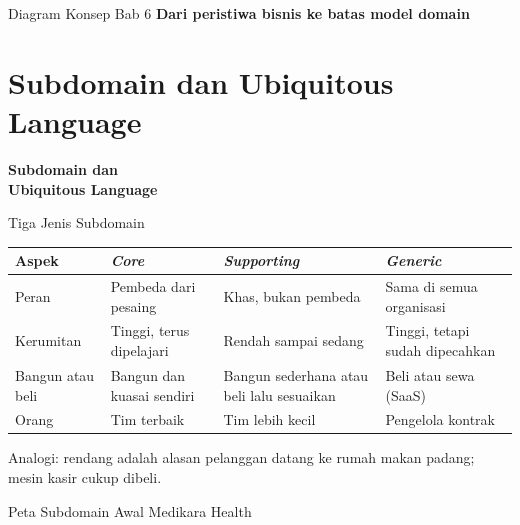 \documentclass[aspectratio=169, table, 12pt]{beamer}
\begin{document}
\begin{frame}{{\Large Diagram Konsep Bab 6}}
  \centering
  {\small\bfseries Dari peristiwa bisnis ke batas model domain}\par\medskip
\end{frame}

\section{Subdomain dan Ubiquitous Language}

\begin{frame}{\hfill}
  \centering
  \Huge{\textbf{Subdomain dan\\Ubiquitous Language}}
\end{frame}

\begin{frame}{{\Large Tiga Jenis Subdomain}}
  \footnotesize
  \begin{tabularx}{\textwidth}{>{\raggedright\arraybackslash}p{2.6cm}
      >{\raggedright\arraybackslash}X >{\raggedright\arraybackslash}X
      >{\raggedright\arraybackslash}X}
    \hline
    \textbf{Aspek} & \textbf{\textit{Core}} & \textbf{\textit{Supporting}}
      & \textbf{\textit{Generic}} \\
    \hline
    Peran & Pembeda dari pesaing & Khas, bukan pembeda & Sama di semua organisasi \\
    \hline
    Kerumitan & Tinggi, terus dipelajari & Rendah sampai sedang & Tinggi, tetapi
      sudah dipecahkan \\
    \hline
    Bangun atau beli & Bangun dan kuasai sendiri & Bangun sederhana atau beli lalu
      sesuaikan & Beli atau sewa (SaaS) \\
    \hline
    Orang & Tim terbaik & Tim lebih kecil & Pengelola kontrak \\
    \hline
  \end{tabularx}

  \vspace{10pt}
  \small
  Analogi: rendang adalah alasan pelanggan datang ke rumah makan padang; mesin
  kasir cukup dibeli.
\end{frame}

\begin{frame}{{\Large Peta Subdomain Awal Medikara Health}}
  \centering
\end{frame}
\end{document}
